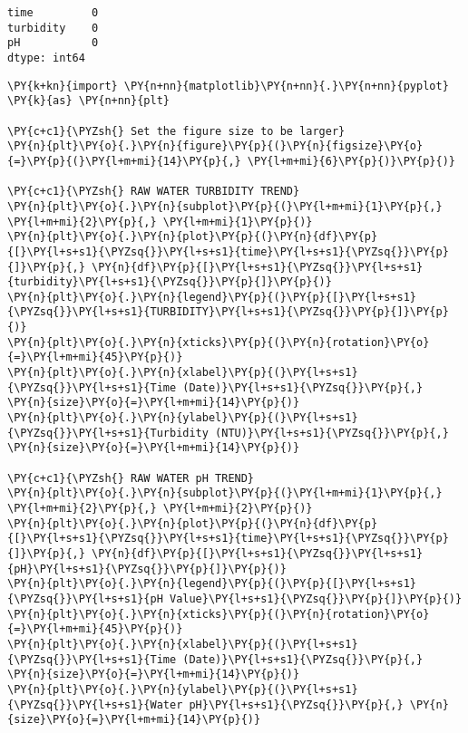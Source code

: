            \begin{tcolorbox}[breakable, size=fbox, boxrule=.5pt, pad at break*=1mm, opacityfill=0]
\begin{Verbatim}[commandchars=\\\{\}]
time         0
turbidity    0
pH           0
dtype: int64
\end{Verbatim}
\end{tcolorbox}
        
    \begin{tcolorbox}[breakable, size=fbox, boxrule=1pt, pad at break*=1mm,colback=cellbackground, colframe=cellborder]
\begin{Verbatim}[commandchars=\\\{\}]
\PY{k+kn}{import} \PY{n+nn}{matplotlib}\PY{n+nn}{.}\PY{n+nn}{pyplot} \PY{k}{as} \PY{n+nn}{plt}

\PY{c+c1}{\PYZsh{} Set the figure size to be larger}
\PY{n}{plt}\PY{o}{.}\PY{n}{figure}\PY{p}{(}\PY{n}{figsize}\PY{o}{=}\PY{p}{(}\PY{l+m+mi}{14}\PY{p}{,} \PY{l+m+mi}{6}\PY{p}{)}\PY{p}{)}

\PY{c+c1}{\PYZsh{} RAW WATER TURBIDITY TREND}
\PY{n}{plt}\PY{o}{.}\PY{n}{subplot}\PY{p}{(}\PY{l+m+mi}{1}\PY{p}{,} \PY{l+m+mi}{2}\PY{p}{,} \PY{l+m+mi}{1}\PY{p}{)}
\PY{n}{plt}\PY{o}{.}\PY{n}{plot}\PY{p}{(}\PY{n}{df}\PY{p}{[}\PY{l+s+s1}{\PYZsq{}}\PY{l+s+s1}{time}\PY{l+s+s1}{\PYZsq{}}\PY{p}{]}\PY{p}{,} \PY{n}{df}\PY{p}{[}\PY{l+s+s1}{\PYZsq{}}\PY{l+s+s1}{turbidity}\PY{l+s+s1}{\PYZsq{}}\PY{p}{]}\PY{p}{)}
\PY{n}{plt}\PY{o}{.}\PY{n}{legend}\PY{p}{(}\PY{p}{[}\PY{l+s+s1}{\PYZsq{}}\PY{l+s+s1}{TURBIDITY}\PY{l+s+s1}{\PYZsq{}}\PY{p}{]}\PY{p}{)}
\PY{n}{plt}\PY{o}{.}\PY{n}{xticks}\PY{p}{(}\PY{n}{rotation}\PY{o}{=}\PY{l+m+mi}{45}\PY{p}{)}
\PY{n}{plt}\PY{o}{.}\PY{n}{xlabel}\PY{p}{(}\PY{l+s+s1}{\PYZsq{}}\PY{l+s+s1}{Time (Date)}\PY{l+s+s1}{\PYZsq{}}\PY{p}{,} \PY{n}{size}\PY{o}{=}\PY{l+m+mi}{14}\PY{p}{)}
\PY{n}{plt}\PY{o}{.}\PY{n}{ylabel}\PY{p}{(}\PY{l+s+s1}{\PYZsq{}}\PY{l+s+s1}{Turbidity (NTU)}\PY{l+s+s1}{\PYZsq{}}\PY{p}{,} \PY{n}{size}\PY{o}{=}\PY{l+m+mi}{14}\PY{p}{)}

\PY{c+c1}{\PYZsh{} RAW WATER pH TREND}
\PY{n}{plt}\PY{o}{.}\PY{n}{subplot}\PY{p}{(}\PY{l+m+mi}{1}\PY{p}{,} \PY{l+m+mi}{2}\PY{p}{,} \PY{l+m+mi}{2}\PY{p}{)}
\PY{n}{plt}\PY{o}{.}\PY{n}{plot}\PY{p}{(}\PY{n}{df}\PY{p}{[}\PY{l+s+s1}{\PYZsq{}}\PY{l+s+s1}{time}\PY{l+s+s1}{\PYZsq{}}\PY{p}{]}\PY{p}{,} \PY{n}{df}\PY{p}{[}\PY{l+s+s1}{\PYZsq{}}\PY{l+s+s1}{pH}\PY{l+s+s1}{\PYZsq{}}\PY{p}{]}\PY{p}{)}
\PY{n}{plt}\PY{o}{.}\PY{n}{legend}\PY{p}{(}\PY{p}{[}\PY{l+s+s1}{\PYZsq{}}\PY{l+s+s1}{pH Value}\PY{l+s+s1}{\PYZsq{}}\PY{p}{]}\PY{p}{)}
\PY{n}{plt}\PY{o}{.}\PY{n}{xticks}\PY{p}{(}\PY{n}{rotation}\PY{o}{=}\PY{l+m+mi}{45}\PY{p}{)}
\PY{n}{plt}\PY{o}{.}\PY{n}{xlabel}\PY{p}{(}\PY{l+s+s1}{\PYZsq{}}\PY{l+s+s1}{Time (Date)}\PY{l+s+s1}{\PYZsq{}}\PY{p}{,} \PY{n}{size}\PY{o}{=}\PY{l+m+mi}{14}\PY{p}{)}
\PY{n}{plt}\PY{o}{.}\PY{n}{ylabel}\PY{p}{(}\PY{l+s+s1}{\PYZsq{}}\PY{l+s+s1}{Water pH}\PY{l+s+s1}{\PYZsq{}}\PY{p}{,} \PY{n}{size}\PY{o}{=}\PY{l+m+mi}{14}\PY{p}{)}


\end{Verbatim}
\end{tcolorbox}
